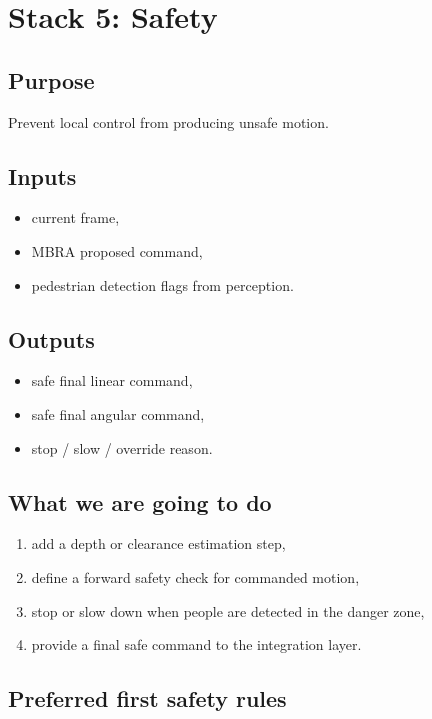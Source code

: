 \documentclass[11pt,a4paper]{article}
\begin{document}
\section{Stack 5: Safety}

\subsection{Purpose}

Prevent local control from producing unsafe motion.

\subsection{Inputs}

\begin{itemize}[nosep]
  \item current frame,
  \item MBRA proposed command,
  \item pedestrian detection flags from perception.
\end{itemize}

\subsection{Outputs}

\begin{itemize}[nosep]
  \item safe final linear command,
  \item safe final angular command,
  \item stop / slow / override reason.
\end{itemize}

\subsection{What we are going to do}

\begin{enumerate}[nosep]
  \item add a depth or clearance estimation step,
  \item define a forward safety check for commanded motion,
  \item stop or slow down when people are detected in the danger zone,
  \item provide a final safe command to the integration layer.
\end{enumerate}

\subsection{Preferred first safety rules}
\end{document}
